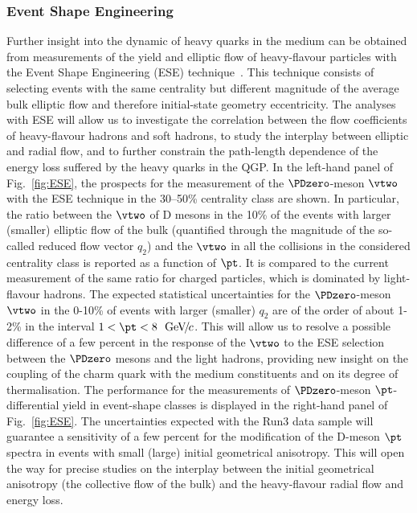  
\subsubsection{Event Shape Engineering}

Further insight into the dynamic of heavy quarks in the medium can be
obtained from measurements of the yield and elliptic flow of heavy-flavour
particles with the Event Shape Engineering (ESE) 
technique~\cite{Schukraft:2012ah}.
This technique consists of selecting events with the same centrality but 
different magnitude of the average bulk elliptic flow and therefore initial-state geometry eccentricity.
The analyses with ESE will allow us to investigate the correlation between 
the flow coefficients of heavy-flavour hadrons and soft hadrons, to study the interplay between elliptic and radial flow, and to further constrain the path-length dependence of the energy loss suffered by the heavy quarks in the QGP.
In the left-hand panel of Fig.~\ref{fig:ESE}, the prospects for the measurement of the ${\PDzero}$-meson $\vtwo$ with the ESE technique in the 30--50\% centrality class are shown.
In particular, the ratio between the $\vtwo$ of D mesons in the 10\% of the events with larger (smaller) elliptic flow of the bulk (quantified through the magnitude of the so-called reduced flow vector $q_2$) and the $\vtwo$ in all the collisions in the considered centrality class is reported as a function of $\pt$.
It is compared to the current measurement of the same ratio for charged 
particles, which is dominated by light-flavour hadrons.
The expected statistical uncertainties for the $\PDzero$-meson $\vtwo$ in the 0-10\% of events with larger (smaller) $q_2$ are of the order of about 1-2\% in the interval $1 < \pt < 8~\UGeVc$. This will allow us to resolve a possible difference of a few percent in the response of the $\vtwo$ to the ESE selection between the $\PDzero$ mesons and the light hadrons, providing new insight on the coupling of the charm quark with the medium constituents and on its degree of thermalisation. 
The performance for the measurements of $\PDzero$-meson 
$\pt$-differential yield in event-shape classes is displayed in the right-hand panel of Fig.~\ref{fig:ESE}.
The uncertainties expected with the Run3 data sample will guarantee a sensitivity of a few percent for the modification of 
the D-meson $\pt$ spectra in events with small (large) initial 
geometrical anisotropy.
This will open the way for precise studies on the interplay between the initial geometrical anisotropy (the collective flow of the bulk) and the heavy-flavour radial flow and energy loss.

